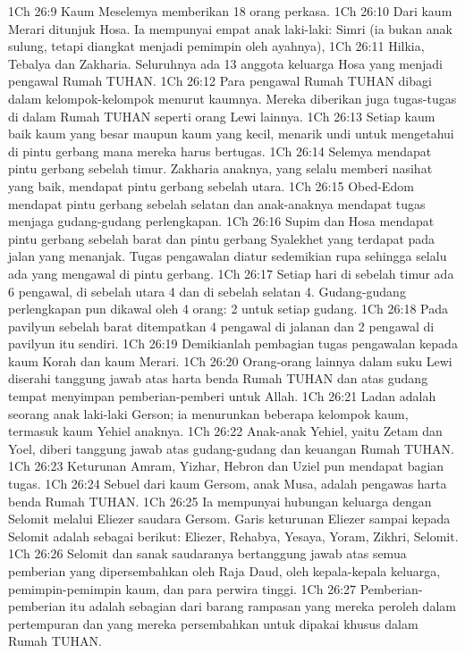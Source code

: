 1Ch 26:9  Kaum Meselemya memberikan 18 orang perkasa.
1Ch 26:10  Dari kaum Merari ditunjuk Hosa. Ia mempunyai empat anak laki-laki: Simri (ia bukan anak sulung, tetapi diangkat menjadi pemimpin oleh ayahnya),
1Ch 26:11  Hilkia, Tebalya dan Zakharia. Seluruhnya ada 13 anggota keluarga Hosa yang menjadi pengawal Rumah TUHAN.
1Ch 26:12  Para pengawal Rumah TUHAN dibagi dalam kelompok-kelompok menurut kaumnya. Mereka diberikan juga tugas-tugas di dalam Rumah TUHAN seperti orang Lewi lainnya.
1Ch 26:13  Setiap kaum baik kaum yang besar maupun kaum yang kecil, menarik undi untuk mengetahui di pintu gerbang mana mereka harus bertugas.
1Ch 26:14  Selemya mendapat pintu gerbang sebelah timur. Zakharia anaknya, yang selalu memberi nasihat yang baik, mendapat pintu gerbang sebelah utara.
1Ch 26:15  Obed-Edom mendapat pintu gerbang sebelah selatan dan anak-anaknya mendapat tugas menjaga gudang-gudang perlengkapan.
1Ch 26:16  Supim dan Hosa mendapat pintu gerbang sebelah barat dan pintu gerbang Syalekhet yang terdapat pada jalan yang menanjak. Tugas pengawalan diatur sedemikian rupa sehingga selalu ada yang mengawal di pintu gerbang.
1Ch 26:17  Setiap hari di sebelah timur ada 6 pengawal, di sebelah utara 4 dan di sebelah selatan 4. Gudang-gudang perlengkapan pun dikawal oleh 4 orang: 2 untuk setiap gudang.
1Ch 26:18  Pada pavilyun sebelah barat ditempatkan 4 pengawal di jalanan dan 2 pengawal di pavilyun itu sendiri.
1Ch 26:19  Demikianlah pembagian tugas pengawalan kepada kaum Korah dan kaum Merari.
1Ch 26:20  Orang-orang lainnya dalam suku Lewi diserahi tanggung jawab atas harta benda Rumah TUHAN dan atas gudang tempat menyimpan pemberian-pemberi untuk Allah.
1Ch 26:21  Ladan adalah seorang anak laki-laki Gerson; ia menurunkan beberapa kelompok kaum, termasuk kaum Yehiel anaknya.
1Ch 26:22  Anak-anak Yehiel, yaitu Zetam dan Yoel, diberi tanggung jawab atas gudang-gudang dan keuangan Rumah TUHAN.
1Ch 26:23  Keturunan Amram, Yizhar, Hebron dan Uziel pun mendapat bagian tugas.
1Ch 26:24  Sebuel dari kaum Gersom, anak Musa, adalah pengawas harta benda Rumah TUHAN.
1Ch 26:25  Ia mempunyai hubungan keluarga dengan Selomit melalui Eliezer saudara Gersom. Garis keturunan Eliezer sampai kepada Selomit adalah sebagai berikut: Eliezer, Rehabya, Yesaya, Yoram, Zikhri, Selomit.
1Ch 26:26  Selomit dan sanak saudaranya bertanggung jawab atas semua pemberian yang dipersembahkan oleh Raja Daud, oleh kepala-kepala keluarga, pemimpin-pemimpin kaum, dan para perwira tinggi.
1Ch 26:27  Pemberian-pemberian itu adalah sebagian dari barang rampasan yang mereka peroleh dalam pertempuran dan yang mereka persembahkan untuk dipakai khusus dalam Rumah TUHAN.
